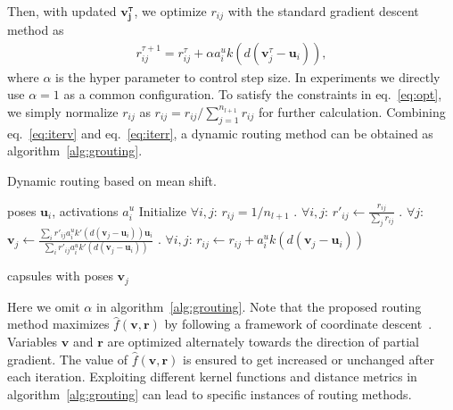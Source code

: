 \documentclass[runningheads]{llncs}
\begin{document}
Then, with updated $\boldsymbol{v_j^{\tau}}$, we optimize $r_{ij}$ with the standard gradient descent method as
\begin{align}
\label{eq:iterr}
r_{ij}^{\tau+1}=r_{ij}^{\tau}+\alpha{a}_i^uk(d(\boldsymbol{v}_j^{\tau}-\boldsymbol{u}_i)),
\end{align}
where $\alpha$ is the hyper parameter to control step size. In experiments we directly use $\alpha=1$ as a common configuration. To satisfy the constraints in eq.~\ref{eq:opt}, we simply normalize $r_{ij}$ as $r_{ij}=r_{ij}/\sum_{j=1}^{n_{l+1}}r_{ij}$ for further calculation. Combining eq.~\ref{eq:iterv} and eq.~\ref{eq:iterr}, a dynamic routing method can be obtained as algorithm~\ref{alg:grouting}.
\begin{algorithm}
  \caption{Dynamic routing based on mean shift.}
  \label{alg:grouting}
  \begin{algorithmic}
   \REQUIRE poses $\boldsymbol{u}_{i}$, activations $a_i^u$
   \STATE Initialize $\forall{i,j}$: $r_{ij}=1/n_{l+1}$
   . $\forall{i,j}$: $r'_{ij}\gets{\frac{r_{ij}}{\sum_jr_{ij}}}$
   . $\forall{j}$: $\boldsymbol{v}_j\gets{\frac{\sum_ir'_{ij}a_i^uk'(d(\boldsymbol{v}_j-\boldsymbol{u}_{i}))\boldsymbol{u}_{i}}{\sum_ir'_{ij}a_i^uk'(d(\boldsymbol{v}_j-\boldsymbol{u}_{i}))}}$
   . $\forall{i,j}$: $r_{ij}\gets{r}_{ij}+a_i^uk(d(\boldsymbol{v}_j-\boldsymbol{u}_{i}))$

   \ENDFOR
   \RETURN capsules with poses $\boldsymbol{v}_j$
  \end{algorithmic}
\end{algorithm}

Here we omit $\alpha$ in algorithm~\ref{alg:grouting}. Note that the proposed routing method maximizes $\hat{f}(\boldsymbol{v},\boldsymbol{r})$ by following a framework of coordinate descent~\cite{wright2015coordinate}. Variables $\boldsymbol{v}$ and $\boldsymbol{r}$ are optimized alternately towards the direction of partial gradient. The value of $\hat{f}(\boldsymbol{v},\boldsymbol{r})$ is ensured to get increased or unchanged after each iteration. Exploiting different kernel functions and distance metrics in algorithm~\ref{alg:grouting} can lead to specific instances of routing methods.
\end{document}
